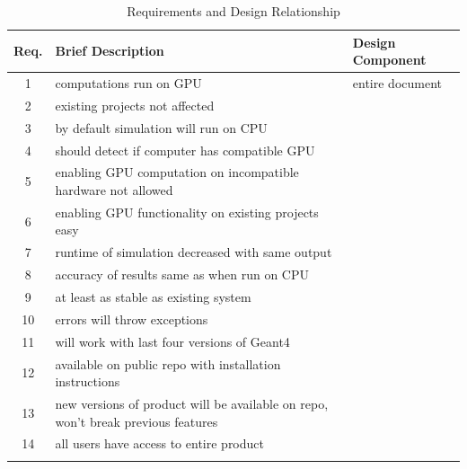 \documentclass[12pt]{article}
\begin{document}
\begin{table}[h]
\centering
\caption{Requirements and Design Relationship}\label{Table_RequirementsAndDesign}
\begin{tabularx}{\textwidth}{cXX}

\toprule
\bf Req. & \bf Brief Description & \bf Design Component\\\midrule
\arrayrulecolor{lightgray}
1  & computations run on GPU & entire document\\\hline
2  & existing projects not affected & \\\hline
3  & by default simulation will run on CPU & \\\hline
4  & should detect if computer has compatible GPU & \\\hline
5  & enabling GPU computation on incompatible hardware not allowed & \\\hline
6  & enabling GPU functionality on existing projects easy & \\\hline
7 & runtime of simulation decreased with same output & \\\hline
8 & accuracy of results same as when run on CPU & \\\hline
9 & at least as stable as existing system & \\\hline
10 & errors will throw exceptions & \\\hline
11 & will work with last four versions of Geant4 & \\\hline
12 & available on public repo with installation instructions & \\\hline
13 & new versions of product will be available on repo, won't break previous features & \\\hline
14 & all users have access to entire product & \\
\arrayrulecolor{black}
\bottomrule
\end{tabularx}
\end{table}
\end{document}
